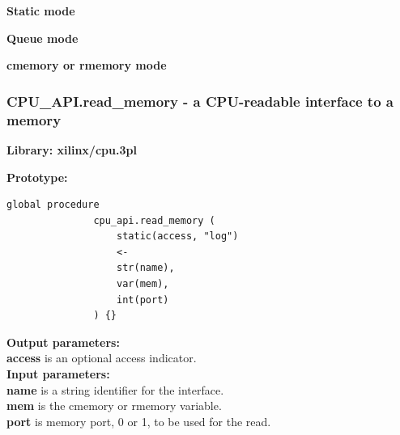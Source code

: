             
            \vspace{\baselineskip}\vspace{\baselineskip}
            {\Large \bfseries Static mode}

                        
                
                        
            

            \vspace{\baselineskip}\vspace{\baselineskip}
            {\Large \bfseries Queue mode}
                        


                
                        
            

            
            \vspace{\baselineskip}\vspace{\baselineskip}
            {\Large \bfseries cmemory or rmemory mode}
            
                






        \subsubsection{CPU\_API.read\_memory - a CPU-readable interface
                                            to a memory}\label{sec:lpcpurdmem}

            {\bf Library: xilinx/cpu.3pl}

            {\bf Prototype:} \\
            \vsp
            \begin{lstlisting}[gobble=12, language=threepl]
               global procedure
               cpu_api.read_memory (
                   static(access, "log")
                   <-
                   str(name),
                   var(mem),
                   int(port)
               ) {}
            \end{lstlisting}

            {\bf Output parameters:} \\
            {\bf access} is an optional access indicator.\\        

            {\bf Input parameters:} \\
            {\bf name} is a string identifier for the interface.\\
            {\bf mem} is the cmemory or rmemory variable.\\
            {\bf port} is memory port, 0 or 1, to be used for the read.
        
